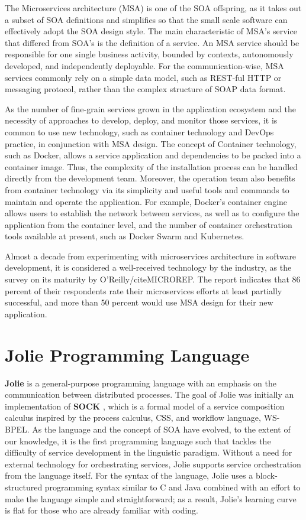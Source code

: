 The Microservices architecture (MSA) is one of the SOA offspring, as it takes out a subset of SOA definitions and simplifies so that the small scale software can effectively adopt the SOA design style. The main characteristic of MSA's service that differed from SOA's is the definition of a service. An MSA service should be responsible for one single business activity, bounded by contexts, autonomously developed, and independently deployable. For the communication-wise, MSA services commonly rely on a simple data model, such as REST-ful HTTP or messaging protocol, rather than the complex structure of SOAP data format.

As the number of fine-grain services grown in the application ecosystem and the necessity of approaches to develop, deploy, and monitor those services, it is common to use new technology, such as container technology and DevOps practice, in conjunction with MSA design. The concept of Container technology, such as Docker, allows a service application and dependencies to be packed into a container image. Thus, the complexity of the installation process can be handled directly from the development team. Moreover, the operation team also benefits from container technology via its simplicity and useful tools and commands to maintain and operate the application. For example, Docker's container engine allows users to establish the network between services, as well as to configure the application from the container level, and the number of container orchestration tools available at present, such as Docker Swarm and Kubernetes.

Almost a decade from experimenting with microservices architecture in software development, it is considered a well-received technology by the industry, as the survey on its maturity by O'Reilly/cite{MICROREP}. The report indicates that 86 percent of their respondents rate their microservices efforts at least partially successful, and more than 50 percent would use MSA design for their new application. 

\section{Jolie Programming Language}

\textbf{Jolie}\cite{JOLIE} is a general-purpose programming language with an emphasis on the communication between distributed processes. The goal of Jolie was initially an implementation of \textbf{SOCK} \cite{10.1007/11948148-27}, which is a formal model of a service composition calculus inspired by the process calculus, CSS\cite{10.5555/539036}, and workflow language, WS-BPEL\cite{OASIS}.
As the language and the concept of SOA have evolved, to the extent of our knowledge, it is the first programming language such that tackles the difficulty of service development in the linguistic paradigm.
Without a need for external technology for orchestrating services, Jolie supports service orchestration from the language itself.
For the syntax of the language, Jolie uses a block-structured programming syntax similar to C and Java combined with an effort to make the language simple and straightforward; as a result, Jolie's learning curve is flat for those who are already familiar with coding.

